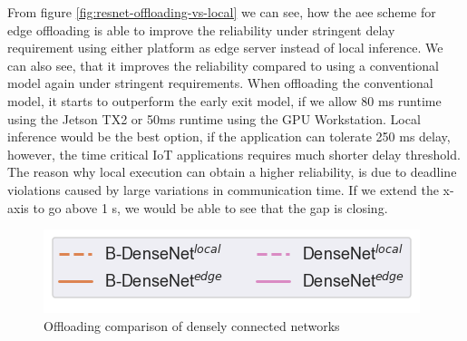 From figure \ref{fig:resnet-offloading-vs-local} we can see, how the \gls{aee} scheme for edge offloading is able to improve the reliability under stringent delay requirement using either platform as edge server instead of local inference. We can also see, that it improves the reliability compared to using a conventional model again under stringent requirements. When offloading the conventional model, it starts to outperform the early exit model, if we allow 80 ms runtime using the Jetson TX2 or 50ms runtime using the GPU Workstation. Local inference would be the best option, if the application can tolerate 250 ms delay, however, the time critical IoT applications requires much shorter delay threshold. The reason why local execution can obtain a higher reliability, is due to deadline violations caused by large variations in communication time. If we extend the x-axis to go above 1 s, we would be able to see that the gap is closing. 

\begin{figure}
	\captionsetup[subfigure]{justification=centering, farskip=0pt,captionskip=0pt}
	\centering
	\includegraphics[width=.3\linewidth]{figures/edge/gpu_b-densenet_offloading_vs_local_legend}
	\hfill
	\hfill
	\caption[Offloading comparison of densely connected networks]{Offloading comparison of densely connected networks}
	\label{fig:densenet-offloading-vs-local}
\end{figure}

